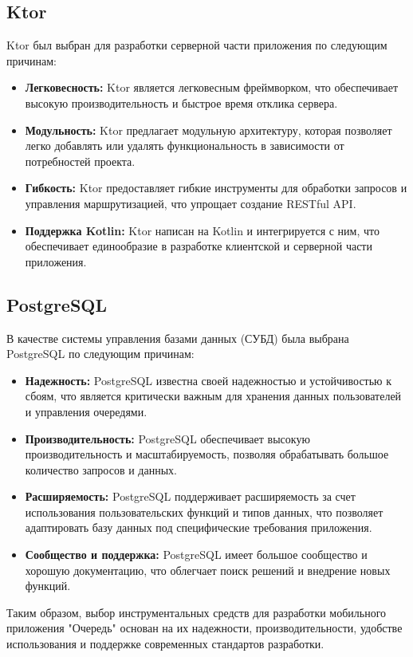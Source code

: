 \subsection{Ktor}

Ktor был выбран для разработки серверной части приложения
по следующим причинам:

\begin{itemize}
    \item \textbf{Легковесность:} Ktor является легковесным фреймворком,
		что обеспечивает высокую производительность
		и быстрое время отклика сервера.
    \item \textbf{Модульность:} Ktor предлагает модульную архитектуру,
		которая позволяет легко добавлять или удалять функциональность
		в зависимости от потребностей проекта.
    \item \textbf{Гибкость:} Ktor предоставляет гибкие инструменты
		для обработки запросов и управления маршрутизацией,
		что упрощает создание RESTful API.
    \item \textbf{Поддержка Kotlin:} Ktor написан на Kotlin и интегрируется
		с ним, что обеспечивает единообразие в разработке клиентской
		и серверной части приложения.
\end{itemize}

\subsection{PostgreSQL}

В качестве системы управления базами данных (СУБД)
была выбрана PostgreSQL по следующим причинам:

\begin{itemize}
    \item \textbf{Надежность:} PostgreSQL известна своей надежностью
		и устойчивостью к сбоям, что является критически важным
		для хранения данных пользователей и управления очередями.
    \item \textbf{Производительность:} PostgreSQL обеспечивает высокую
		производительность и масштабируемость,
		позволяя обрабатывать большое количество запросов и данных.
    \item \textbf{Расширяемость:} PostgreSQL поддерживает расширяемость
		за счет использования пользовательских функций и типов данных,
		что позволяет адаптировать базу данных
		под специфические требования приложения.
    \item \textbf{Сообщество и поддержка:} PostgreSQL имеет большое сообщество
		и хорошую документацию, что облегчает поиск решений
		и внедрение новых функций.
\end{itemize}

Таким образом, выбор инструментальных средств
для разработки мобильного приложения "Очередь" основан на их надежности,
производительности, удобстве использования
и поддержке современных стандартов разработки.

